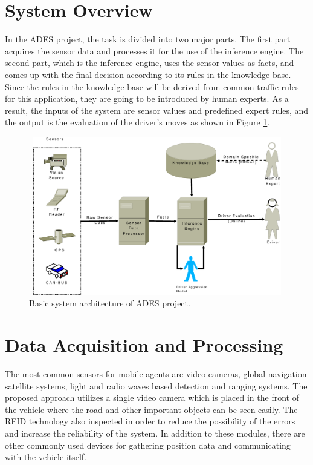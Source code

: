 \documentclass[a4paper,oneside,12pt]{report}
\begin{document}
\section{System Overview}
In the ADES project, the task is divided into two major parts. The first part acquires the sensor data and processes it for the use of the inference engine. The second part, which is the inference engine, uses the sensor values as facts, and comes up with the final decision according to its rules in the knowledge base. Since the rules in the knowledge base will be derived from common traffic rules for this application, they are going to be introduced by human experts. As a result, the inputs of the system are sensor values and predefined expert rules, and the output is the evaluation of the driver's moves as shown in Figure \ref{fig:sys}.
\begin{figure}[ht]
\begin{center}
\includegraphics[width=141mm,height=69mm]{img/sys3.eps}
\caption{Basic system architecture of ADES project.}
\label{fig:sys}
\end{center}
\end{figure}

\section{Data Acquisition and Processing}
The most common sensors for mobile agents are video cameras, global navigation satellite systems, light and radio waves based detection and ranging systems. The proposed approach utilizes a single video camera which is placed in the front of the vehicle where the road and other important objects can be seen easily. The RFID technology also inspected in order to reduce the possibility of the errors and increase the reliability of the system. In addition to these modules, there are other commonly used devices for gathering position data and communicating with the vehicle itself.
\end{document}
